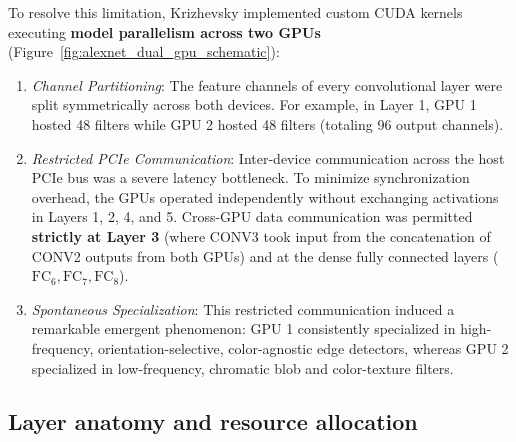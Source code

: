 To resolve this limitation, Krizhevsky implemented custom CUDA kernels executing \textbf{model parallelism across two GPUs} (Figure~\ref{fig:alexnet_dual_gpu_schematic}):
\begin{enumerate}[leftmargin=*]
  \item \textit{Channel Partitioning}: The feature channels of every convolutional layer were split symmetrically across both devices. For example, in Layer 1, GPU 1 hosted 48 filters while GPU 2 hosted 48 filters (totaling 96 output channels).
  \item \textit{Restricted PCIe Communication}: Inter-device communication across the host PCIe bus was a severe latency bottleneck. To minimize synchronization overhead, the GPUs operated independently without exchanging activations in Layers 1, 2, 4, and 5. Cross-GPU data communication was permitted \textbf{strictly at Layer 3} (where CONV3 took input from the concatenation of CONV2 outputs from both GPUs) and at the dense fully connected layers ($\text{FC}_6, \text{FC}_7, \text{FC}_8$).
  \item \textit{Spontaneous Specialization}: This restricted communication induced a remarkable emergent phenomenon: GPU 1 consistently specialized in high-frequency, orientation-selective, color-agnostic edge detectors, whereas GPU 2 specialized in low-frequency, chromatic blob and color-texture filters.
\end{enumerate}

\subsection{Layer anatomy and resource allocation}
\label{sec:alexnet_layer_anatomy}

